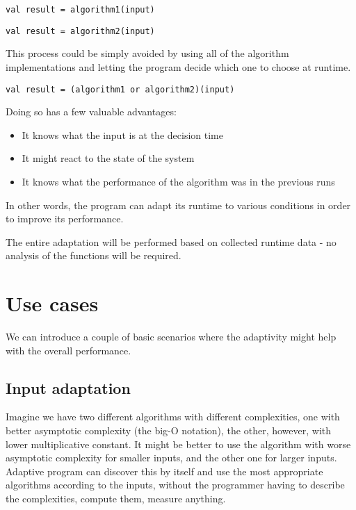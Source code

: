 \lstset{style=Scala}
\begin{lstlisting}
val result = algorithm1(input)
\end{lstlisting}

\lstset{style=Scala}
\begin{lstlisting}
val result = algorithm2(input)
\end{lstlisting}

This process could be simply avoided by using all of the algorithm implementations and letting the program decide which one to choose at runtime.

\lstset{style=Scala}
\begin{lstlisting}
val result = (algorithm1 or algorithm2)(input)
\end{lstlisting}

Doing so has a few valuable advantages:
\begin{itemize}
	\item It knows what the input is at the decision time
	\item It might react to the state of the system
	\item It knows what the performance of the algorithm was in the previous runs
\end{itemize}

In other words, the program can adapt its runtime to various conditions in order to improve its performance.

The entire adaptation will be performed based on collected runtime data - no analysis of the functions will be required.

\section{Use cases}

We can introduce a couple of basic scenarios where the adaptivity might help with the overall performance.

\subsection{Input adaptation}

Imagine we have two different algorithms with different complexities, one with better asymptotic complexity (the big-O notation), the other, however, with lower multiplicative constant. It might be better to use the algorithm with worse asymptotic complexity for smaller inputs, and the other one for larger inputs. Adaptive program can discover this by itself and use the most appropriate algorithms according to the inputs, without the programmer having to describe the complexities, compute them, measure anything.

